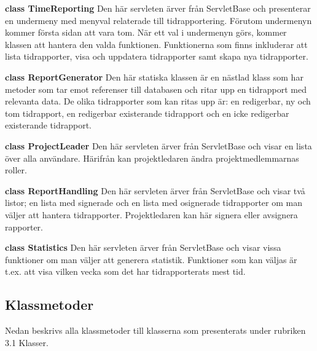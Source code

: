 \documentclass[a4paper]{article}
\begin{document}
\vspace{5mm}
\begin{hangparas}{1.5em}{1}
\textbf{class TimeReporting} Den här servleten ärver från ServletBase och presenterar en undermeny med menyval relaterade till tidrapportering. Förutom undermenyn kommer första sidan att vara tom. När ett val i undermenyn görs, kommer klassen att hantera den valda funktionen. Funktionerna som finns inkluderar att lista tidrapporter, visa och uppdatera tidrapporter samt skapa nya tidrapporter.\end{hangparas}

\vspace{5mm}
\begin{hangparas}{1.5em}{1}
\textbf{class ReportGenerator} Den här statiska klassen är en nästlad klass som har metoder som tar emot referenser till databasen och ritar upp en tidrapport med relevanta data. De olika tidrapporter som kan ritas upp är: en redigerbar, ny och tom tidrapport, en redigerbar existerande tidrapport och en icke redigerbar existerande tidrapport.\end{hangparas}

\vspace{5mm}
\begin{hangparas}{1.5em}{1}
\textbf{class ProjectLeader} Den här servleten ärver från ServletBase och visar en lista över alla användare. Härifrån kan projektledaren ändra projektmedlemmarnas roller. \end{hangparas}

\vspace{5mm}
\begin{hangparas}{1.5em}{1}
\textbf{class ReportHandling} Den här servleten ärver från ServletBase och visar två listor; en lista med signerade och en lista med osignerade tidrapporter om man väljer att hantera tidrapporter. Projektledaren kan här signera eller avsignera rapporter.\end{hangparas}

\vspace{5mm}
\begin{hangparas}{1.5em}{1}
\textbf{class Statistics} Den här servleten ärver från ServletBase och visar vissa funktioner om man väljer att generera statistik. Funktioner som kan väljas är t.ex. att visa vilken vecka som det har tidrapporterats mest tid.\\ \end{hangparas}

\subsection{Klassmetoder}
Nedan beskrivs alla klassmetoder till klasserna som presenterats under rubriken 3.1 Klasser.
\end{document}
